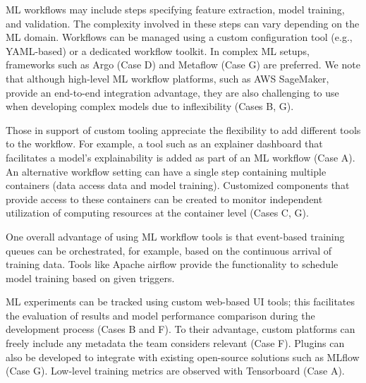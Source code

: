 \documentclass{IEEEcsmag}
\begin{document}
ML workflows may include steps specifying feature extraction, model training, and validation. The complexity involved in these steps can vary depending on the ML domain. Workflows can be managed using a custom configuration tool (e.g., YAML-based) or a dedicated workflow toolkit. In complex ML setups, frameworks such as Argo (Case D) and Metaflow (Case G) are preferred. We note that although high-level ML workflow platforms, such as AWS SageMaker, provide an end-to-end integration advantage, they are also challenging to use when developing complex models due to inflexibility (Cases B, G).



Those in support of custom tooling appreciate the flexibility to add different tools to the workflow. For example, a tool such as an explainer dashboard that facilitates a model's explainability is added as part of an ML workflow (Case A). An alternative workflow setting can have a single step containing multiple containers (data access data and model training). Customized components that provide access to these containers can be created to monitor independent utilization of computing resources at the container level (Cases C, G).

One overall advantage of using ML workflow tools is that event-based training queues can be orchestrated, for example, based on the continuous arrival of training data.  Tools like Apache airflow provide the functionality to schedule model training based on given triggers.

ML experiments can be tracked using custom web-based UI tools; this facilitates the evaluation of results and model performance comparison during the development process (Cases B and F). To their advantage, custom platforms can freely include any metadata the team considers relevant (Case F). Plugins can also be developed to integrate with existing open-source solutions such as MLflow (Case G). Low-level training metrics are observed with Tensorboard (Case A).
\end{document}

